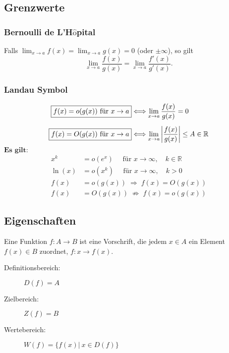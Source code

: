 \subsection{Grenzwerte}
    \subsubsection{Bernoulli de L'H$\hat{\textrm{o}}$pital}
        Falls $\displaystyle \lim_{x \to a} f(x) = \lim_{x \to a} g(x) = 0$ (oder $\pm \infty$), so gilt
        $$
            \lim_{x \to a} \frac{f(x)}{g(x)} = \lim_{x \to a} \frac{f'(x)}{g'(x)}.
        $$
    \subsubsection{Landau Symbol}
        \vspace{-0.5em}
        \begin{align*}
            \fbox{$f(x) = o(g(x)) \textrm{ für } x \to a$} &\Longleftrightarrow \lim_{x \to a} \frac{f(x)}{g(x)} = 0\\[0.5em]
            \fbox{$f(x) = O(g(x)) \textrm{ für } x \to a$}  &\Longleftrightarrow \lim_{x \to a} \left\lvert\frac{f(x)}{g(x)}\right\rvert \leq A \in \mathbb{R}
        \end{align*}
        $\textbf{Es gilt:}$
            \begin{align*}
                x^k &= o(e^x) \quad \textrm{ für } x \to \infty, \quad k \in \mathbb{R}\\
                \ln(x) &= o(x^k) \quad \textrm{ für } x \to \infty, \quad k > 0\\[0.5em]
                f(x) &= o(g(x)) \; \Rightarrow \; f(x) = O(g(x))\\
                f(x) &= O(g(x)) \; \nRightarrow \; f(x) = o(g(x))
            \end{align*}
    \subsection{Eigenschaften}
        Eine Funktion $f : A \to B$ ist eine Vorschrift, die jedem $x \in A$ ein Element $f(x) \in B$ zuordnet, $f: x \to f(x)$.
        \begin{description}
            \item[Definitionsbereich:] $D(f) = A$
            \item[Zielbereich:] $Z(f) = B$
            \item[Wertebereich:] $W(f) = \{ f(x) \vert \ x \in D(f)\}$   
        \end{description}
